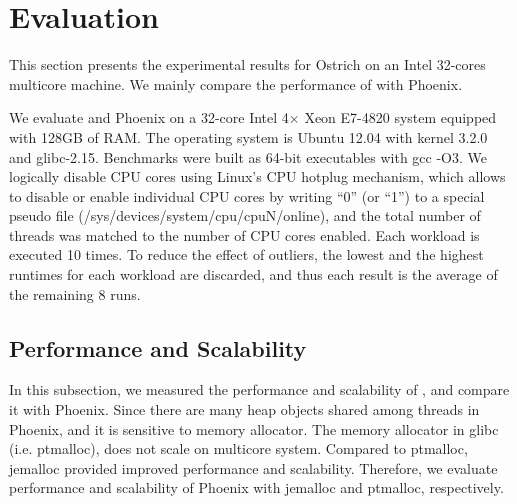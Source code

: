 \section{Evaluation}
\label{sec:eval}
This section presents the experimental results for Ostrich on an Intel 32-cores multicore machine. 
We mainly compare the performance of \myds with Phoenix.

We evaluate \myds and Phoenix on a 32-core Intel 4× Xeon E7-4820 system equipped with 128GB of RAM. 
The operating system is Ubuntu 12.04 with kernel 3.2.0 and glibc-2.15.
Benchmarks were built as 64-bit executables with gcc -O3.
We logically disable CPU cores using Linux’s CPU hotplug mechanism, which allows to disable or enable individual CPU cores by writing “0” (or “1”) to a special pseudo file (/sys/devices/system/cpu/cpuN/online), and the total number of threads was matched to the number of CPU cores enabled.
Each workload is executed 10 times. 
To reduce the effect of outliers, the lowest and the highest runtimes for each workload are discarded, and thus each result is the average of the remaining 8 runs.

\subsection{Performance and Scalability}
In this subsection, we measured the performance and scalability of \myds, and compare it with Phoenix.  
Since there are many heap objects shared among threads in Phoenix, and it is sensitive to memory allocator.
The memory allocator in glibc (i.e. ptmalloc\cite{gloger1997ptmalloc}), does not scale on multicore system. 
Compared to ptmalloc\cite{gloger1997ptmalloc}, jemalloc provided improved performance and scalability\cite{evans2006jemalloc}. 
Therefore, we evaluate performance and scalability of Phoenix with jemalloc and ptmalloc, respectively.

